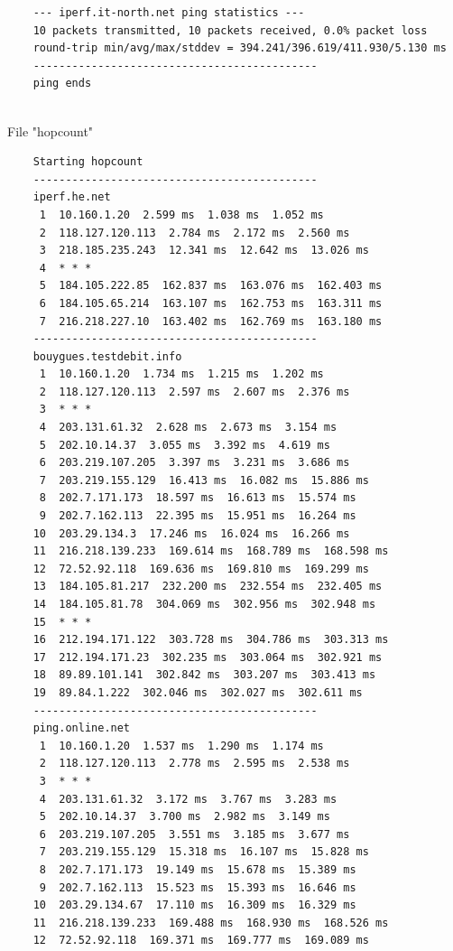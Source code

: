 \documentclass[paper=a4, fontsize=10pt]{scrartcl} %
\numberwithin{equation}{section} %
\numberwithin{figure}{section} %
\numberwithin{table}{section} %
\begin{document}
\begin{lstlisting}
    --- iperf.it-north.net ping statistics ---
    10 packets transmitted, 10 packets received, 0.0% packet loss
    round-trip min/avg/max/stddev = 394.241/396.619/411.930/5.130 ms
    --------------------------------------------
    ping ends
    
\end{lstlisting}

File "hopcount"
\begin{lstlisting}
    Starting hopcount
    --------------------------------------------
    iperf.he.net
     1  10.160.1.20  2.599 ms  1.038 ms  1.052 ms
     2  118.127.120.113  2.784 ms  2.172 ms  2.560 ms
     3  218.185.235.243  12.341 ms  12.642 ms  13.026 ms
     4  * * *
     5  184.105.222.85  162.837 ms  163.076 ms  162.403 ms
     6  184.105.65.214  163.107 ms  162.753 ms  163.311 ms
     7  216.218.227.10  163.402 ms  162.769 ms  163.180 ms
    --------------------------------------------
    bouygues.testdebit.info
     1  10.160.1.20  1.734 ms  1.215 ms  1.202 ms
     2  118.127.120.113  2.597 ms  2.607 ms  2.376 ms
     3  * * *
     4  203.131.61.32  2.628 ms  2.673 ms  3.154 ms
     5  202.10.14.37  3.055 ms  3.392 ms  4.619 ms
     6  203.219.107.205  3.397 ms  3.231 ms  3.686 ms
     7  203.219.155.129  16.413 ms  16.082 ms  15.886 ms
     8  202.7.171.173  18.597 ms  16.613 ms  15.574 ms
     9  202.7.162.113  22.395 ms  15.951 ms  16.264 ms
    10  203.29.134.3  17.246 ms  16.024 ms  16.266 ms
    11  216.218.139.233  169.614 ms  168.789 ms  168.598 ms
    12  72.52.92.118  169.636 ms  169.810 ms  169.299 ms
    13  184.105.81.217  232.200 ms  232.554 ms  232.405 ms
    14  184.105.81.78  304.069 ms  302.956 ms  302.948 ms
    15  * * *
    16  212.194.171.122  303.728 ms  304.786 ms  303.313 ms
    17  212.194.171.23  302.235 ms  303.064 ms  302.921 ms
    18  89.89.101.141  302.842 ms  303.207 ms  303.413 ms
    19  89.84.1.222  302.046 ms  302.027 ms  302.611 ms
    --------------------------------------------
    ping.online.net
     1  10.160.1.20  1.537 ms  1.290 ms  1.174 ms
     2  118.127.120.113  2.778 ms  2.595 ms  2.538 ms
     3  * * *
     4  203.131.61.32  3.172 ms  3.767 ms  3.283 ms
     5  202.10.14.37  3.700 ms  2.982 ms  3.149 ms
     6  203.219.107.205  3.551 ms  3.185 ms  3.677 ms
     7  203.219.155.129  15.318 ms  16.107 ms  15.828 ms
     8  202.7.171.173  19.149 ms  15.678 ms  15.389 ms
     9  202.7.162.113  15.523 ms  15.393 ms  16.646 ms
    10  203.29.134.67  17.110 ms  16.309 ms  16.329 ms
    11  216.218.139.233  169.488 ms  168.930 ms  168.526 ms
    12  72.52.92.118  169.371 ms  169.777 ms  169.089 ms

\end{lstlisting}
\end{document}
